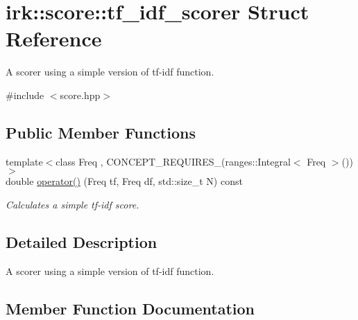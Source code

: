 \hypertarget{structirk_1_1score_1_1tf__idf__scorer}{}\section{irk\+:\+:score\+:\+:tf\+\_\+idf\+\_\+scorer Struct Reference}
\label{structirk_1_1score_1_1tf__idf__scorer}


A scorer using a simple version of tf-\/idf function.  




{\ttfamily \#include $<$score.\+hpp$>$}

\subsection*{Public Member Functions}
\begin{DoxyCompactItemize}
\item 
{\footnotesize template$<$class Freq , C\+O\+N\+C\+E\+P\+T\+\_\+\+R\+E\+Q\+U\+I\+R\+E\+S\+\_\+(ranges\+::\+Integral$<$ Freq $>$()) $>$ }\\double \mbox{\hyperlink{structirk_1_1score_1_1tf__idf__scorer_ad5627516d1f6fdd092174b46cadcb672}{operator()}} (Freq tf, Freq df, std\+::size\+\_\+t N) const
\begin{DoxyCompactList}\small\item\em Calculates a simple tf-\/idf score. \end{DoxyCompactList}\end{DoxyCompactItemize}


\subsection{Detailed Description}
A scorer using a simple version of tf-\/idf function. 

\subsection{Member Function Documentation}
\mbox{\label{structirk_1_1score_1_1tf__idf__scorer_ad5627516d1f6fdd092174b46cadcb672}} 
